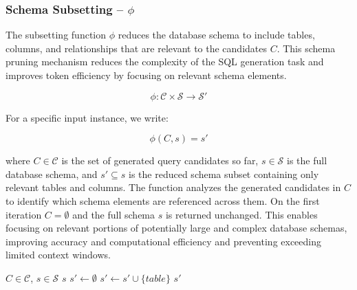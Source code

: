 \subsubsection{Schema Subsetting – $\phi$}\label{design:subsetting-function}

The subsetting function $\phi$ reduces the database schema to include
tables, columns, and relationships that are relevant to the candidates
$C$. This schema pruning mechanism reduces the complexity of the SQL generation
task and improves token efficiency by focusing on relevant schema elements.

$$
\phi: \mathcal{C} \times \mathcal{S} \rightarrow \mathcal{S}'
$$

\vspace{0.5em}

For a specific input instance, we write:

$$
\phi(C, s) = s'
$$

\vspace{0.5em}

where $C \in \mathcal{C}$ is the set of generated query candidates so far, $s
\in \mathcal{S}$ is the full database schema, and $s' \subseteq s$ is the
reduced schema subset containing only relevant tables and columns. The function
analyzes the generated candidates in $C$ to identify which schema elements are
referenced across them. On the first iteration $C = \emptyset$ and the full
schema $s$ is returned unchanged. This enables focusing on relevant portions of
potentially large and complex database schemas, improving accuracy and
computational efficiency and preventing exceeding limited context windows.

\begin{algorithm}
\caption{$\phi$ - Schema Subsetting}\label{algorithms:phi}
\begin{algorithmic}[1]
\Require $C \in \mathcal{C}$, $s \in \mathcal{S}$
 \Return $s$ \EndIf              {}
\State $s' \gets \emptyset$                          
            
        \State $s' \gets s' \cup \{table\}$          
    \EndIf
\EndFor
\State \Return $s'$                                  
\end{algorithmic}
\end{algorithm}

